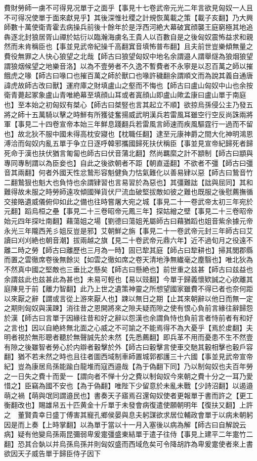 費財勞師一虜不可得見况單于之面乎【事見十七卷武帝元光二年言欲見匈奴一人且不可得况使單于面來獻見乎】其後深惟社稷之計規恢萬載之策【載子亥翻】乃大興師數十萬使衛青霍去病操兵前後十餘年於是浮西河絶大幕破窴顔襲王庭窮極其地追犇逐北封狼居胥山禪於姑衍以臨瀚海虜名王貴人以百數自是之後匈奴震怖益求和親然而未肯稱臣也【事並見武帝紀操千高翻窴音填怖普布翻】且夫前世豈樂傾無量之費役無罪之人快心狼望之北哉【師古曰狼望匈奴中地名余謂邉人謂舉燧為狼烟狼望謂狼烟候望之地樂音洛】以為不壹勞者不久逸不暫費者不永寧是以忍百萬之師以摧餓虎之喙【師古曰喙口也摧百萬之師於獸口也喙許穢翻余謂順文而為說其義自通唐諱虎故師古改曰獸】運府庫之財填盧山之壑而不悔也【師古曰盧山匈奴中山也余按衛青薨起冢象盧山青唯絶幕至填顔山耳或者寘顔山即盧山歟孟康曰盧山單于南庭也】至本始之初匈奴有桀心【師古曰桀竪也言其起立不順】欲掠烏孫侵公主乃發五將之師十五萬騎以擊之時鮮有所獲徒奮揚威武明漢兵若雷風耳雖空行空反尚誅兩將軍【事見二十四卷宣帝本始三年鮮息踐翻兵若雷風言師速而疾風驅霆行一過而不留也】故北狄不服中國未得高枕安寢也【枕職任翻】逮至元康神爵之間大化神明鴻恩溥洽而匈奴内亂五單于争立日逐呼韓邪攜國歸死扶伏稱臣【事並見宣帝紀歸死者歸死命于漢也扶伏猶言匍匐也師古曰伏音蒲北翻】然尚羈縻之計不顓制【師古曰顓與專同專制謂以為臣妾也】自此之後欲朝者不距【朝直遥翻】不欲者不彊【師古曰彊音其兩翻】何者外國天性忿鷙形容魁健負力怙氣難化以善易肄以惡【師古曰鷙音竹二翻鷙狠也魁大也負恃也余謂肄習也言易習於為惡也】其彊難詘【詘與屈同】其和難得故未服之時勞師遠攻傾國殚貨伏尸流血破堅拔敵如彼之難也既服之後慰薦撫循交接賂遺威儀俯仰如此之備也往時嘗屠大宛之城【事見二十一卷武帝太初三年宛於元翻】蹈烏桓之壘【事見二十三卷昭帝元鳳三年】探姑繒之壁【事見二十三卷昭帝始元四年探吐南翻】藉蕩姐之場【劉德曰蕩姐羌屬師古曰藉猶蹈也姐音紫余據元帝永光三年隴西羌彡姐反豈是邪】艾朝鮮之旃【事見二十一卷武帝元封三年師古曰艾讀曰刈刈絶也朝音潮】拔兩越之旗【見二十卷武帝元鼎六年】近不過旬月之役遠不離二時之勞【師古曰離歷也三月為一時】固已犂其庭【師占曰犂耕也】掃其閭郡縣而置之雲徹席卷後無餘災【如雲之徹如席之卷天清地浄無纎毫之塵翳也】唯北狄為不然真中國之堅敵也三垂比之懸矣【師古曰懸絶也】前世重之兹甚【師古曰兹益也余謂兹此也兹甚此為甚也】未易可輕也【易以豉翻】今單于歸義懷欵誠之心欲離其庭陳見于前【離力智翻】此乃上世之遺策神靈之所想望國家雖費不得已者也奈何距以來厭之辭【謂或言從上游來厭人也】踈以無日之期【止其來朝辭以他日而無一定之期則匈奴與漢踈】消往昔之恩開將來之隙夫疑而隙之使有恨心負前言緣往辭歸怨於漢【師古曰言單于因緣往昔和好之辭以怨漢也余謂負恃也負前言者恃前者有和好之言也】因以自絶終無北面之心威之不可諭之不能焉得不為大憂乎【焉於䖍翻】夫明者視於無形聰者聽於無聲誠先於未然【先悉薦翻】即兵革不用而憂患不生不然壹有隙之後雖智者勞心於内辯者轂擊於外【師古曰轂擊言使車交馳其轂相擊也轂戶容翻】猶不若未然之時也且往者圖西域制車師置城郭都護三十六國【事並見武帝宣帝紀】豈為康居烏孫能踰白龍堆而寇西邉哉【為于偽翻下同】乃以制匈奴也夫百年勞之一日失之費十而愛一【謂向者不惮十分之費以制匈奴今來朝之費十分之一耳乃愛惜之】臣竊為國不安也【為于偽翻】唯陛下少留意於未亂未戰【少詩沼翻】以遏邉萌之禍【萌與氓同謂邉民也】書奏天子寤焉召還匈奴使者更報單于書而許之【更工衡翻改也】賜雄帠五十匹黄金十斤單于未發會病復遣使願朝明年【復扶又翻】上許之　董賢貴幸日盛丁傅害其寵孔鄉侯晏與息夫躬謀欲求居位輔政會單于以病未朝躬因是而上奏【上時掌翻】以為單于當以十一月入塞後以病為解【師古曰自解說云病】疑有他變烏孫兩昆彌弱卑爰疐彊盛東結單于遣子往侍【事見上建平二年疐竹二翻】恐其合埶以并烏孫烏孫并則匈奴盛而西域危矣可令降胡詐為卑爰疐使者來上書欲因天子威告單于歸臣侍子因下